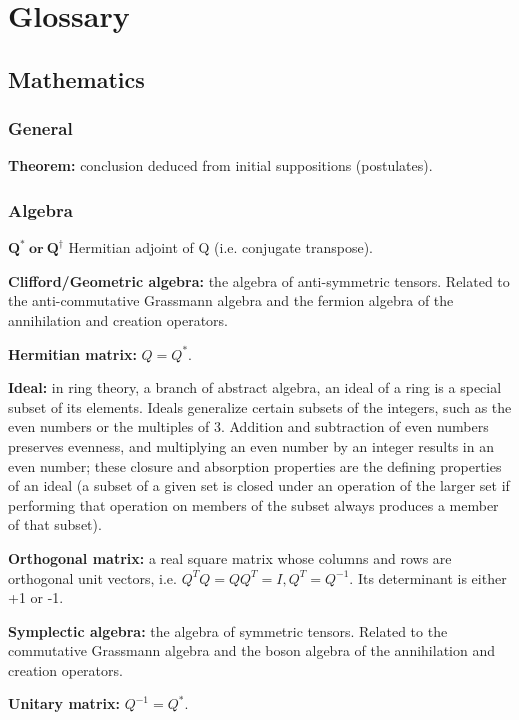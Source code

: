 \part{Glossary}

\chapter{Mathematics}

\section{General}

\begin{list}{}{}
	\item \textbf{Theorem:} conclusion deduced from initial suppositions (postulates).
\end{list}

\section{Algebra}

\begin{list}{}{}
	\item \textbf{$\mathbf{Q^* \: or \: Q^{\dagger}}$} Hermitian adjoint of Q (i.e. conjugate transpose).
	
	\item \textbf{Clifford/Geometric algebra:} the algebra of anti-symmetric tensors. Related to the anti-commutative Grassmann algebra and the fermion algebra of the annihilation and creation operators.
		
	\item \textbf{Hermitian matrix:} $Q=Q^*$.
	
	\item \textbf{Ideal:} in ring theory, a branch of abstract algebra, an ideal of a ring is a special subset of its elements. Ideals generalize certain subsets of the integers, such as the even numbers or the multiples of 3. Addition and subtraction of even numbers preserves evenness, and multiplying an even number by an integer results in an even number; these closure and absorption properties are the defining properties of an ideal (a subset of a given set is closed under an operation of the larger set if performing that operation on members of the subset always produces a member of that subset).
	
	\item \textbf{Orthogonal matrix:} a real square matrix whose columns and rows are orthogonal unit vectors, i.e. $Q^T Q=QQ^T=I, Q^T=Q^{-1}$. Its determinant is either +1 or -1.
			
	\item \textbf{Symplectic algebra:} the algebra of symmetric tensors. Related to the commutative Grassmann algebra and the boson algebra of the annihilation and creation operators.
	
	\item \textbf{Unitary matrix:} $Q^{-1}=Q^*$.
\end{list}{}{}


